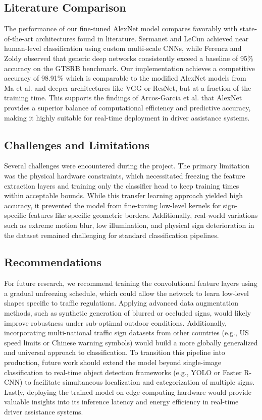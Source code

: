 \documentclass[conference]{IEEEtran}
\begin{document}
\subsection{Literature Comparison}
The performance of our fine-tuned AlexNet model compares favorably with state-of-the-art architectures found in literature. Sermanet and LeCun achieved near human-level classification using custom multi-scale CNNs, while Ferencz and Zoldy observed that generic deep networks consistently exceed a baseline of 95\% accuracy on the GTSRB benchmark. Our implementation achieves a competitive accuracy of 98.91\% which is comparable to the modified AlexNet models from Ma et al. and deeper architectures like VGG or ResNet, but at a fraction of the training time. This supports the findings of Arcos-Garcia et al. that AlexNet provides a superior balance of computational efficiency and predictive accuracy, making it highly suitable for real-time deployment in driver assistance systems.

\subsection{Challenges and Limitations}
Several challenges were encountered during the project. The primary limitation was the physical hardware constraints, which necessitated freezing the feature extraction layers and training only the classifier head to keep training times within acceptable bounds. While this transfer learning approach yielded high accuracy, it prevented the model from fine-tuning low-level kernels for sign-specific features like specific geometric borders. Additionally, real-world variations such as extreme motion blur, low illumination, and physical sign deterioration in the dataset remained challenging for standard classification pipelines.

\subsection{Recommendations}
For future research, we recommend training the convolutional feature layers using a gradual unfreezing schedule, which could allow the network to learn low-level shapes specific to traffic regulations. Applying advanced data augmentation methods, such as synthetic generation of blurred or occluded signs, would likely improve robustness under sub-optimal outdoor conditions. Additionally, incorporating multi-national traffic sign datasets from other countries (e.g., US speed limits or Chinese warning symbols) would build a more globally generalized and universal approach to classification. To transition this pipeline into production, future work should extend the model beyond single-image classification to real-time object detection frameworks (e.g., YOLO or Faster R-CNN) to facilitate simultaneous localization and categorization of multiple signs. Lastly, deploying the trained model on edge computing hardware would provide valuable insights into its inference latency and energy efficiency in real-time driver assistance systems.




\end{document}
